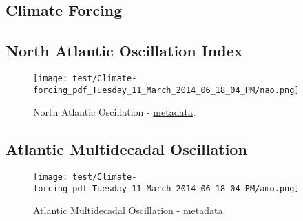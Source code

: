 \documentclass{article}
\begin{document}
        \begin{twocolumn}
        \section{Climate Forcing}
        
        
        \subsection{North Atlantic Oscillation Index}
        
        \begin{figure}[h]
        {\texttt{[image: test/Climate-forcing\_pdf\_Tuesday\_11\_March\_2014\_06\_18\_04\_PM/nao.png]}}
        \caption{North Atlantic Oscillation - \href{http://nbviewer.ipython.org/9917cffb8674b50c538c}{metadata}.}
        \end{figure}
        
        \subsection{Atlantic Multidecadal Oscillation}
        
        \begin{figure}[h]
        {\texttt{[image: test/Climate-forcing\_pdf\_Tuesday\_11\_March\_2014\_06\_18\_04\_PM/amo.png]}}
        \caption{Atlantic Multidecadal Oscillation - \href{http://nbviewer.ipython.org/82c1d7f46dde4296d4ab}{metadata}.}
        \end{figure}
        
        \end{twocolumn}
        
\end{document}
